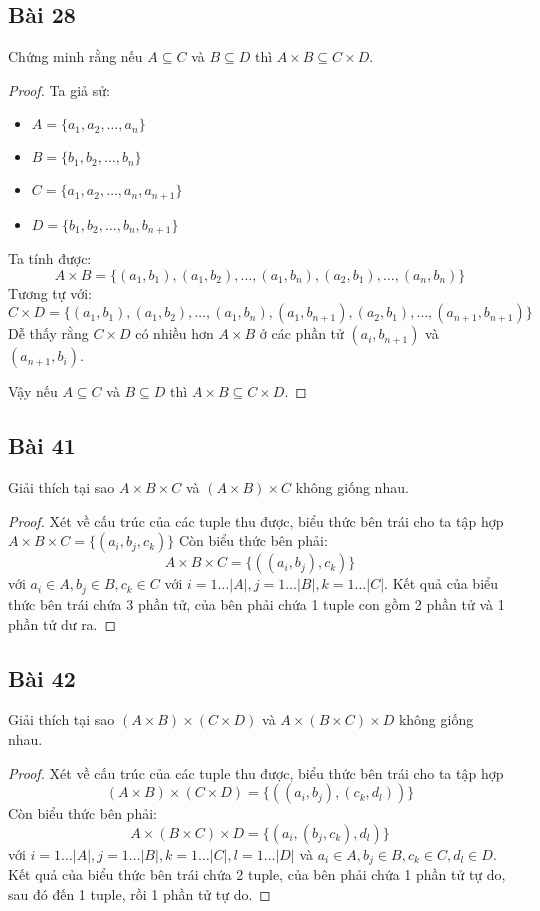 \subsection*{Bài 28}
Chứng minh rằng nếu $A\subseteq C$ và $B\subseteq D$ thì $A\times B\subseteq C\times D$.
\begin{proof}
    Ta giả sử: \begin{itemize}
        \item $A=\{a_1,a_2,\dots,a_n\}$
        \item $B=\{b_1,b_2,\dots,b_n\}$
        \item $C=\{a_1,a_2,\dots,a_n,a_{n+1}\}$
        \item $D=\{b_1,b_2,\dots,b_n,b_{n+1}\}$
    \end{itemize}
    Ta tính được: $$A\times B=\{(a_1,b_1),(a_1,b_2),\dots,(a_1,b_n),(a_2,b_1),\dots,(a_n,b_n)\}$$
    Tương tự với: $$C\times D=\{(a_1,b_1),(a_1,b_2),\dots,(a_1,b_n),(a_1,b_{n+1}),(a_2,b_1),\dots,(a_{n+1},b_{n+1})\}$$
    Dễ thấy rằng $C\times D$ có nhiều hơn $A\times B$ ở các phần tử $(a_i,b_{n+1})$ và $(a_{n+1},b_i)$.

    Vậy nếu $A\subseteq C$ và $B\subseteq D$ thì $A\times B\subseteq C\times D$.
\end{proof}
\subsection*{Bài 41}
Giải thích tại sao $A\times B\times C$ và $(A\times B)\times C$ không giống nhau.
\begin{proof}
    \par Xét về cấu trúc của các tuple thu được, biểu thức bên trái cho ta tập hợp $A\times B\times C=\{(a_i,b_j,c_k)\}$ Còn biểu thức bên phải: $$A\times B\times C=\{((a_i,b_j),c_k)\}$$ với $a_i\in A,b_j\in B,c_k\in C$ với $i=1\dots|A|,j=1\dots|B|,k=1\dots|C|$. Kết quả của biểu thức bên trái chứa 3 phần tử, của bên phải chứa 1 tuple con gồm 2 phần tử và 1 phần tử dư ra.
\end{proof}
\subsection*{Bài 42}
Giải thích tại sao $(A\times B)\times(C\times D)$ và $A\times(B\times C)\times D$ không giống nhau.
\begin{proof}
    \par Xét về cấu trúc của các tuple thu được, biểu thức bên trái cho ta tập hợp $$(A\times B)\times(C\times D)=\{((a_i,b_j),(c_k,d_l))\}$$ Còn biểu thức bên phải: $$A\times(B\times C)\times D=\{(a_i,(b_j,c_k),d_l)\}$$ với $i=1\dots|A|,j=1\dots|B|,k=1\dots|C|,l=1\dots|D|$ và $a_i\in A,b_j\in B,c_k\in C,d_l\in D$. Kết quả của biểu thức bên trái chứa 2 tuple, của bên phải chứa 1 phần tử tự do, sau đó đến 1 tuple, rồi 1 phần tử tự do.
\end{proof}
